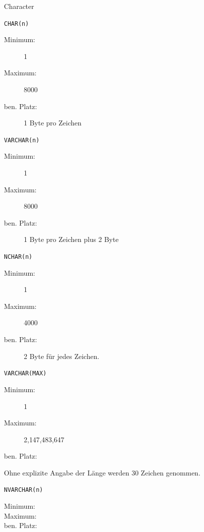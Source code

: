 \documentclass[12pt,ngerman,a4paper,index=totoc,twoside]{scrartcl}
\newcommand{\sql}[1]{\texttt{#1}}
\begin{document}
\begin{compactitem}

 \item Character
 \begin{compactitem}
  \item \sql{CHAR(n)}  

   \begin{description}
  	\item[Minimum:] 1 
  	\item[Maximum:] 8000
  	\item[ben. Platz:] 1 Byte pro Zeichen
  \end{description}	


  \item \sql{VARCHAR(n)} \label{VARCHAR} 
  
  \begin{description}
  	\item[Minimum:] 1
  	\item[Maximum:] 8000
  	\item[ben. Platz:] 1 Byte pro Zeichen plus 2 Byte
  \end{description}	

  \item \sql{NCHAR(n)}  

   \begin{description}
  	\item[Minimum:] 1
  	\item[Maximum:] 4000
  	\item[ben. Platz:] 2 Byte für jedes Zeichen.
  \end{description}	

  \item \sql{VARCHAR(MAX)} 

   \begin{description}
  	\item[Minimum:] 1
  	\item[Maximum:] 2,147,483,647
  	\item[ben. Platz:] 
  \end{description}	

Ohne explizite Angabe der Länge werden 30 Zeichen genommen. 

  \item \sql{NVARCHAR(n)}  

   \begin{description}
  	\item[Minimum:] 
  	\item[Maximum:] 
  	\item[ben. Platz:] 
  \end{description}	



\end{compactitem}
\end{compactitem}
\end{document}
